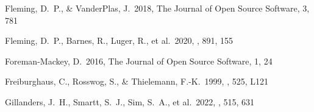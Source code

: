 \documentclass[twocolumn,twocolappendix]{aastex63}
\begin{document}
\begin{thebibliography}{}






 Fleming, D.~P., \& VanderPlas, J.\ 2018, The Journal of Open Source Software, 3, 781


 Fleming, D.~P., Barnes, R., Luger, R., et al.\ 2020, \apj, 891, 155






 Foreman-Mackey, D.\ 2016, The Journal of Open Source Software, 1, 24







 
 Freiburghaus, C., Rosswog, S., \& Thielemann, F.-K.\ 1999, \apjl, 525, L121






 Gillanders, J.~H., Smartt, S.~J., Sim, S.~A., et al.\ 2022, \mnras, 515, 631



\end{thebibliography}
\end{document}
